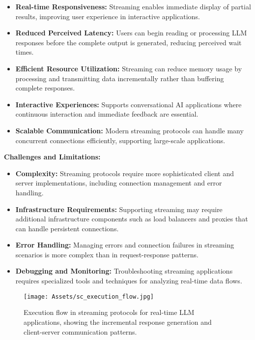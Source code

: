 \begin{itemize}
    \item \textbf{Real-time Responsiveness:} Streaming enables immediate display of partial results, improving user experience in interactive applications.
    \item \textbf{Reduced Perceived Latency:} Users can begin reading or processing LLM responses before the complete output is generated, reducing perceived wait times.
    \item \textbf{Efficient Resource Utilization:} Streaming can reduce memory usage by processing and transmitting data incrementally rather than buffering complete responses.
    \item \textbf{Interactive Experiences:} Supports conversational AI applications where continuous interaction and immediate feedback are essential.
    \item \textbf{Scalable Communication:} Modern streaming protocols can handle many concurrent connections efficiently, supporting large-scale applications.
\end{itemize}

\textbf{Challenges and Limitations:}

\begin{itemize}
    \item \textbf{Complexity:} Streaming protocols require more sophisticated client and server implementations, including connection management and error handling.
    \item \textbf{Infrastructure Requirements:} Supporting streaming may require additional infrastructure components such as load balancers and proxies that can handle persistent connections.
    \item \textbf{Error Handling:} Managing errors and connection failures in streaming scenarios is more complex than in request-response patterns.
    \item \textbf{Debugging and Monitoring:} Troubleshooting streaming applications requires specialized tools and techniques for analyzing real-time data flows.
\end{itemize}

\begin{figure}[H]
    \centering
    \texttt{[image: Assets/sc\_execution\_flow.jpg]}
    \caption{Execution flow in streaming protocols for real-time LLM applications, showing the incremental response generation and client-server communication patterns.}
    \label{fig:streaming_protocols}
\end{figure}

